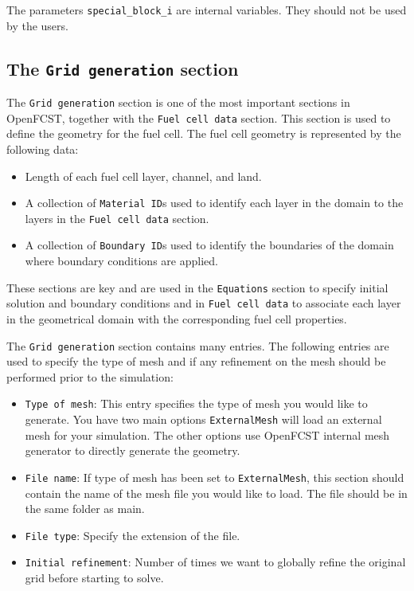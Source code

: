 The parameters \texttt{special\_block\_i} are internal variables. They should not be used by the users.

\subsection{The \texttt{Grid generation} section}

The \texttt{Grid generation} section is one of the most important sections in OpenFCST, together with the \texttt{Fuel cell data} section. This section is used to define the geometry for the fuel cell. The fuel cell geometry is represented by the following data:
\begin{itemize}
 \item Length of each fuel cell layer, channel, and land.
 \item A collection of \texttt{Material ID}s used to identify each layer in the domain to the layers in the \texttt{Fuel cell data} section.
 \item A collection of \texttt{Boundary ID}s used to identify the boundaries of the domain where boundary conditions are applied.
\end{itemize}
These sections are key and are used in the \texttt{Equations} section to specify initial solution and boundary conditions and in \texttt{Fuel cell data} to associate each layer in the geometrical domain with the corresponding fuel cell properties.

The \texttt{Grid generation} section contains many entries. The following entries are used to specify the type of mesh and if any refinement on the mesh should be performed prior to the simulation:
\begin{itemize}
 \item \texttt{Type of mesh}: This entry specifies the type of mesh you would like to generate. You have two main options \texttt{ExternalMesh} will load an external mesh for your simulation. The other options use OpenFCST internal mesh generator to directly generate the geometry. 
 \item \texttt{File name}: If type of mesh has been set to \texttt{ExternalMesh}, this section should contain the name of the mesh file you would like to load. The file should be in the same folder as main.
 \item \texttt{File type}: Specify the extension of the file.
 \item \texttt{Initial refinement}: Number of times we want to globally refine the original grid before starting to solve.        
\end{itemize}

